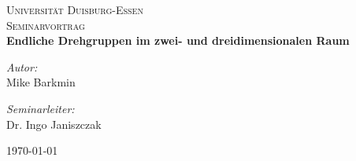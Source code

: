 
\begin{titlepage}
\begin{center}


\textsc{\LARGE Universität Duisburg-Essen}\\[1.5cm]

\textsc{\Large Seminarvortrag}\\[0.5cm]

{ \huge \bfseries Endliche Drehgruppen im zwei- und dreidimensionalen Raum \\[0.4cm] }

\begin{minipage}{0.4\textwidth}
\begin{flushleft} \large
\emph{Autor:}\\
Mike Barkmin
\end{flushleft}
\end{minipage}
\begin{minipage}{0.4\textwidth}
\begin{flushright} \large
\emph{Seminarleiter:} \\
Dr. Ingo Janiszczak
\end{flushright}
\end{minipage}

\vfill

{\large \today}
\end{center}
\end{titlepage}